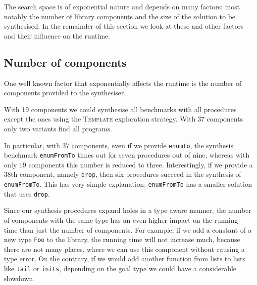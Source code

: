 The search space is of exponential nature and depends on many factors: most notably the number of library components and the size of the solution to be synthesised. In the remainder of this section we look at these and other factors and their influence on the runtime.

\subsection{Number of components}
One well known factor that exponentially affects the runtime is the number of components provided to the synthesiser.

With 19 components we could synthesise all benchmarks with all procedures except the ones using the \textsc{Template} exploration strategy. With 37 components only two variants find all programs.

In particular, with $37$ components, even if we provide \lstinline?enumTo?, the synthesis benchmark \lstinline?enumFromTo? times out for seven procedures out of nine, whereas with only $19$ components this number is reduced to three.
Interestingly, if we provide a $38$th component, namely \lstinline?drop?, then six procedures succeed in the synthesis of \lstinline?enumFromTo?. This has very simple explanation: \lstinline?enumFromTo? has a smaller solution that uses \lstinline?drop?.

Since our synthesis procedures expand holes in a type aware manner, the number of components with the same type has an even higher impact on the running time than just the number of components. For example, if we add a constant of a new type \lstinline?Foo? to the library, the running time will not increase much, because there are not many places, where we can use this component without causing a type error. On the contrary, if we would add another function from lists to lists like \lstinline?tail? or \lstinline?inits?, depending on the goal type we could have a considerable slowdown. 

